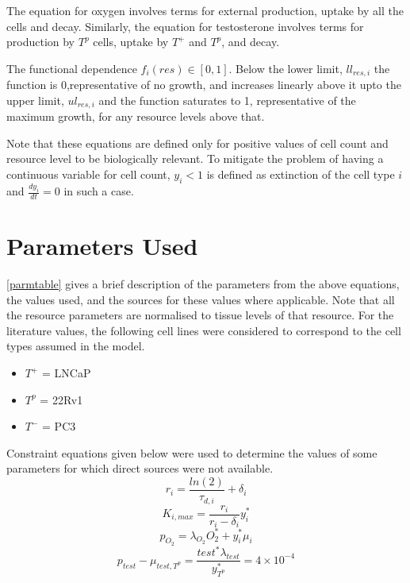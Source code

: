 The equation for oxygen involves terms for external production, uptake by all the cells and decay. Similarly, the equation for testosterone involves terms for production by $T^p$ cells, uptake by $T^+$ and $T^p$, and decay.

The functional dependence $f_i(res) \in [0,1]$. Below the lower limit, $ll_{res,i}$ the function is 0,representative of no growth, and increases linearly above it upto the upper limit, $ul_{res,i}$ and the function saturates to 1, representative of the maximum growth, for any resource levels above that.

Note that these equations are defined only for positive values of cell count and resource level to be biologically relevant. To mitigate the problem of having a continuous variable for  cell count, $y_i < 1$ is defined as extinction of the cell type $i$ and $\frac{dy_i}{dt}=0$ in such a case.

\section{Parameters Used}
\autoref{parmtable} gives a brief description of the parameters from the above equations, the values used, and the sources for these values where applicable. Note that all the resource parameters are normalised to tissue levels of that resource. For the literature values, the following cell lines were considered to correspond to the cell types assumed in the model.
\begin{itemize}
  \item $T^+$ = LNCaP
  \item $T^p$ = 22Rv1
  \item $T^-$ = PC3
\end{itemize}

Constraint equations given below were used to determine the values of some parameters for which direct sources were not available.
\begin{equation}
  r_i = \frac{ln(2)}{\tau_{d,i}} + \delta_i
  \label{r_eq}
\end{equation}
\begin{equation}
  K_{i,max}=\frac{r_i}{r_i-\delta_i} y_i^*
  \label{rho_eq}
\end{equation}
\begin{equation}
  p_{O_2} = \lambda_{O_2} O_2^* + y_i^* \mu_i
  \label{p_o2_eq}
\end{equation}
\begin{equation}
  p_{test} - \mu_{test,T^p} = \frac{test^* \lambda_{test}}{y_{T^p}^*} = 4 \times 10^{-4}
  \label{p_test_eq}
\end{equation}

